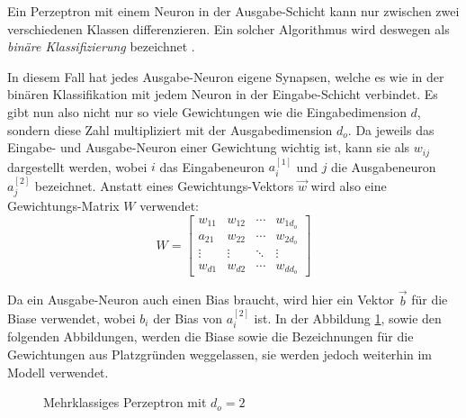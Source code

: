 \documentclass[12pt,titlepage]{article}
\begin{document}
Ein Perzeptron mit einem Neuron in der Ausgabe-Schicht kann nur zwischen zwei verschiedenen Klassen differenzieren. Ein solcher Algorithmus wird deswegen als \textit{binäre Klassifizierung} bezeichnet \autocite{sharmaWhatHellPerceptron2019}.

In diesem Fall hat jedes Ausgabe-Neuron eigene Synapsen, welche es wie in der binären Klassifikation mit jedem Neuron in der Eingabe-Schicht verbindet. Es gibt nun also nicht nur so viele Gewichtungen wie die Eingabedimension $d$, sondern diese Zahl multipliziert mit der Ausgabedimension $d_o$. Da jeweils das Eingabe- und Ausgabe-Neuron einer Gewichtung wichtig ist, kann sie als $w_{ij}$ dargestellt werden, wobei $i$ das Eingabeneuron \(a^{[1]}_i\) und $j$ die Ausgabeneuron \(a^{[2]}_j\) bezeichnet. Anstatt eines Gewichtungs-Vektors \(\vec{w}\) wird also eine Gewichtungs-Matrix \(W\) verwendet:
\[
  W =
  \begin{bmatrix}
    w_{11} & w_{12} & \cdots & w_{1d_o} \\
    a_{21} & w_{22} & \cdots & w_{2d_o} \\
    \vdots & \vdots & \ddots & \vdots   \\
    w_{d1} & w_{d2} & \cdots & w_{dd_o}
  \end{bmatrix}
\]

Da ein Ausgabe-Neuron auch einen Bias braucht, wird hier ein Vektor \(\vec{b}\) für die Biase verwendet, wobei $b_i$ der Bias von \(a^{[2]}_i\) ist. In der Abbildung \ref{fig:multiclass}, sowie den folgenden Abbildungen, werden die Biase sowie die Bezeichnungen für die Gewichtungen aus Platzgründen weggelassen, sie werden jedoch weiterhin im Modell verwendet.

\begin{figure}[H]
  \centering


  \caption{Mehrklassiges Perzeptron mit \(d_o=2\)}
  \label{fig:multiclass}
\end{figure}
\end{document}
